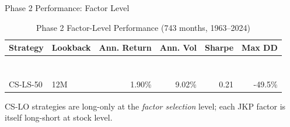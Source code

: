 \documentclass[
  ignorenonframetext,
  aspectratio=169]{beamer}
\begin{document}
\begin{frame}{Phase 2 Performance: Factor Level}
\label{phase-2-performance-factor-level}
\begin{table}[!h]
\centering
\caption{\label{tab:p2-factor-level}Phase 2 Factor-Level Performance (743 months, 1963--2024)}
\centering
\fontsize{8}{10}\selectfont
\begin{tabular}[t]{llrrrr}
\toprule
Strategy & Lookback & Ann. Return & Ann. Vol & Sharpe & Max DD\\
\midrule
\cellcolor[HTML]{f5f9ff}{\cellcolor{gray!10}{CS-LO-50}} & \cellcolor[HTML]{f5f9ff}{\cellcolor{gray!10}{1M}} & \cellcolor[HTML]{f5f9ff}{\cellcolor{gray!10}{2.84\%}} & \cellcolor[HTML]{f5f9ff}{\cellcolor{gray!10}{6.10\%}} & \cellcolor[HTML]{f5f9ff}{\cellcolor{gray!10}{0.47}} & \cellcolor[HTML]{f5f9ff}{\cellcolor{gray!10}{-16.4\%}}\\
\cellcolor[HTML]{f5f9ff}{CS-LO-50} & \cellcolor[HTML]{f5f9ff}{6M} & \cellcolor[HTML]{f5f9ff}{3.30\%} & \cellcolor[HTML]{f5f9ff}{6.13\%} & \cellcolor[HTML]{f5f9ff}{0.54} & \cellcolor[HTML]{f5f9ff}{-13.4\%}\\
\textbf{\cellcolor[HTML]{f5f9ff}{\cellcolor{gray!10}{CS-LO-50}}} & \textbf{\cellcolor[HTML]{f5f9ff}{\cellcolor{gray!10}{12M}}} & \textbf{\cellcolor[HTML]{f5f9ff}{\cellcolor{gray!10}{3.20\%}}} & \textbf{\cellcolor[HTML]{f5f9ff}{\cellcolor{gray!10}{5.46\%}}} & \textbf{\cellcolor[HTML]{f5f9ff}{\cellcolor{gray!10}{0.59}}} & \textbf{\cellcolor[HTML]{f5f9ff}{\cellcolor{gray!10}{-13.4\%}}}\\
\cellcolor[HTML]{f5f9ff}{CS-LO-25} & \cellcolor[HTML]{f5f9ff}{1M} & \cellcolor[HTML]{f5f9ff}{2.74\%} & \cellcolor[HTML]{f5f9ff}{8.39\%} & \cellcolor[HTML]{f5f9ff}{0.33} & \cellcolor[HTML]{f5f9ff}{-26.2\%}\\
\cellcolor[HTML]{f5f9ff}{\cellcolor{gray!10}{CS-LO-25}} & \cellcolor[HTML]{f5f9ff}{\cellcolor{gray!10}{6M}} & \cellcolor[HTML]{f5f9ff}{\cellcolor{gray!10}{3.55\%}} & \cellcolor[HTML]{f5f9ff}{\cellcolor{gray!10}{8.34\%}} & \cellcolor[HTML]{f5f9ff}{\cellcolor{gray!10}{0.43}} & \cellcolor[HTML]{f5f9ff}{\cellcolor{gray!10}{-25.6\%}}\\
\addlinespace
\textbf{\cellcolor[HTML]{f5f9ff}{CS-LO-25}} & \textbf{\cellcolor[HTML]{f5f9ff}{12M}} & \textbf{\cellcolor[HTML]{f5f9ff}{3.66\%}} & \textbf{\cellcolor[HTML]{f5f9ff}{7.60\%}} & \textbf{\cellcolor[HTML]{f5f9ff}{0.48}} & \textbf{\cellcolor[HTML]{f5f9ff}{-23.1\%}}\\
\cellcolor{gray!10}{CS-LS-50} & \cellcolor{gray!10}{1M} & \cellcolor{gray!10}{1.19\%} & \cellcolor{gray!10}{9.14\%} & \cellcolor{gray!10}{0.13} & \cellcolor{gray!10}{-45.8\%}\\
CS-LS-50 & 12M & 1.90\% & 9.02\% & 0.21 & -49.5\%\\
\bottomrule
\end{tabular}
\end{table}

\small CS-LO strategies are long-only at the \emph{factor selection}
level; each JKP factor is itself long-short at stock level.
\end{frame}
\end{document}
